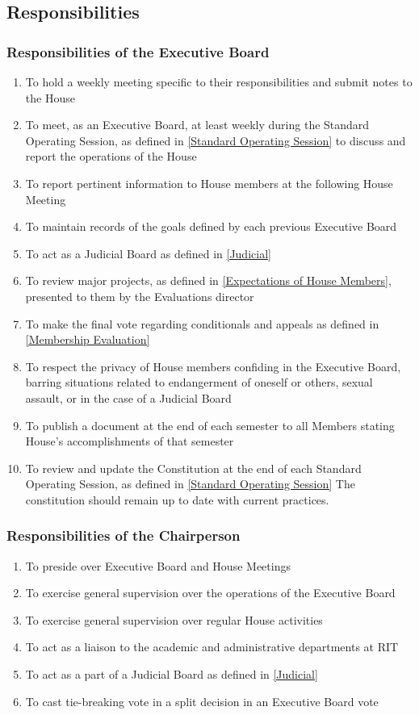 \documentclass{article}
\newcommand{\asection}[1]{\subsection{#1} \label{#1}}
\newcommand{\asubsection}[1]{\subsubsection{#1} \label{#1}}
\begin{document}
\asection{Responsibilities}
\renewcommand{\theenumi}{\alph{enumi}} %
\asubsection{Responsibilities of the Executive Board}
\begin{enumerate}
	\item To hold a weekly meeting specific to their responsibilities and submit notes to the House
	\item To meet, as an Executive Board, at least weekly during the Standard Operating Session, as defined in \ref{Standard Operating Session} to discuss and report the operations of the House
	\item To report pertinent information to House members at the following House Meeting
	\item To maintain records of the goals defined by each previous Executive Board
	\item To act as a Judicial Board as defined in \ref{Judicial}
	\item To review major projects, as defined in \ref{Expectations of House Members}, presented to them by the Evaluations director
	\item To make the final vote regarding conditionals and appeals as defined in \ref{Membership Evaluation}
	\item To respect the privacy of House members confiding in the Executive Board, barring situations related to endangerment of oneself or others, sexual assault, or in the case of a Judicial Board
	\item To publish a document at the end of each semester to all Members stating House’s accomplishments of that semester
	\item To review and update the Constitution at the end of each Standard Operating Session, as defined in \ref{Standard Operating Session}
		The constitution should remain up to date with current practices.
\end{enumerate}

\asubsection{Responsibilities of the Chairperson}
\begin{enumerate}
	\item To preside over Executive Board and House Meetings
	\item To exercise general supervision over the operations of the Executive Board
	\item To exercise general supervision over regular House activities
	\item To act as a liaison to the academic and administrative departments at RIT
	\item To act as a part of a Judicial Board as defined in \ref{Judicial}
	\item To cast tie-breaking vote in a split decision in an Executive Board vote
\end{enumerate}
\end{document}
